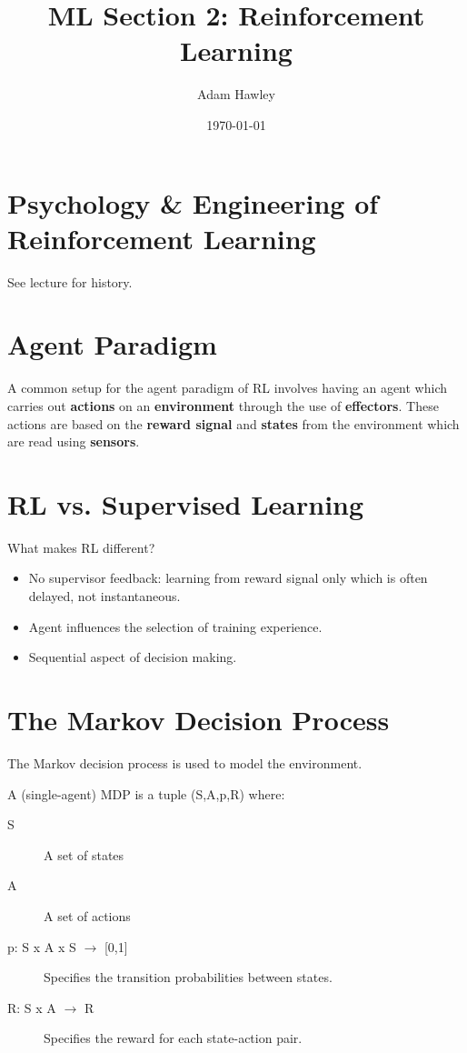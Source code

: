 \documentclass[11pt]{article}
\author{Adam Hawley}
\date{\today}
\title{ML Section 2: Reinforcement Learning}
\begin{document}
\maketitle
\tableofcontents


\section{Psychology \& Engineering of Reinforcement Learning}
\label{sec:orgcb40a6d}
See lecture for history.

\section{Agent Paradigm}
\label{sec:org5391637}
A common setup for the agent paradigm of RL involves having an agent which carries out \textbf{actions} on an \textbf{environment} through the use of \textbf{effectors}.
These actions are based on the \textbf{reward signal} and \textbf{states} from the environment which are read using \textbf{sensors}.

\section{RL vs. Supervised Learning}
\label{sec:org0b07d2b}
What makes RL different?
\begin{itemize}
\item No supervisor feedback: learning from reward signal only which is often delayed, not instantaneous.
\item Agent influences the selection of training experience.
\item Sequential aspect of decision making.
\end{itemize}

\section{The Markov Decision Process}
\label{sec:org3a0296f}
The Markov decision process is used to model the environment.

A (single-agent) MDP is a tuple (S,A,p,R) where:
\begin{description}
\item[{S}] A set of states
\item[{A}] A set of actions
\item[{p: S x A x S \(\rightarrow\) [0,1]}] Specifies the transition probabilities between states.
\item[{R: S x A \(\rightarrow\) R}] Specifies the reward for each state-action pair.
\end{description}
\end{document}
